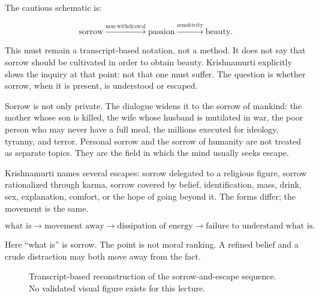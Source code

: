 \documentclass[11pt,oneside]{book}
\begin{document}
The cautious schematic is:

\begin{equation}
\text{sorrow}
\xrightarrow{\text{non-withdrawal}}
\text{passion}
\xrightarrow{\text{sensitivity}}
\text{beauty}.
\end{equation}

This must remain a transcript-based notation, not a method. It does not say that sorrow should be cultivated in order to obtain beauty. Krishnamurti explicitly slows the inquiry at that point: not that one must suffer. The question is whether sorrow, when it is present, is understood or escaped.

Sorrow is not only private. The dialogue widens it to the sorrow of mankind: the mother whose son is killed, the wife whose husband is mutilated in war, the poor person who may never have a full meal, the millions executed for ideology, tyranny, and terror. Personal sorrow and the sorrow of humanity are not treated as separate topics. They are the field in which the mind usually seeks escape.

Krishnamurti names several escapes: sorrow delegated to a religious figure, sorrow rationalized through karma, sorrow covered by belief, identification, mass, drink, sex, explanation, comfort, or the hope of going beyond it. The forms differ; the movement is the same.

\begin{equation}
\text{what is}
\longrightarrow
\text{movement away}
\longrightarrow
\text{dissipation of energy}
\longrightarrow
\text{failure to understand what is}.
\end{equation}

Here ``what is'' is sorrow. The point is not moral ranking. A refined belief and a crude distraction may both move away from the fact.

\begin{figure}
\centering
{}

Transcript-based reconstruction of the sorrow-and-escape sequence. No validated visual figure exists for this lecture.
\end{figure}
\end{document}
